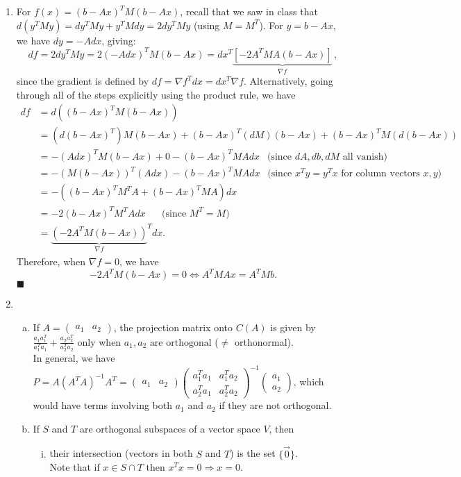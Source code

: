 \documentclass[12pt]{article}
\begin{document}
\begin{enumerate}[1.]
    \item For $f(x) = (b - Ax)^T M (b-Ax)$, recall that we saw in class that $d(y^T M y) = dy^T M y + y^T M dy = 2 dy^T M y$ (using $M = M^T$). For $y = b - Ax$, we have $dy = -Adx$, giving:
    \[
    df = 2 dy^T M y = 2 (-Adx)^T M (b - Ax) = dx^T \underbrace{[-2 A^T M A (b - Ax)]}_{\nabla f} \, ,
    \]
    since the gradient is defined by $df = \nabla f ^T dx = dx^T \nabla f$.  Alternatively, going through all of the steps explicitly using the product rule, we have
    \[
    \begin{split}
    df &= d((b - Ax)^T M (b-Ax)) \\
    &= (d(b - Ax)^T) M (b-Ax) + (b - Ax)^T (dM) (b-Ax) + (b - Ax)^T M (d(b-Ax)) \\
    &= -(A dx)^T M (b-Ax) + 0 - (b - Ax)^T M A dx \ \ \text{ (since $dA, db, dM$ all vanish)}\\
    &=-(M(b-Ax))^T (A dx) - (b-Ax)^T M A dx \ \ \text{ (since $x^T y = y^T x$ for column vectors $x,y$)}\\
    &=-((b-Ax)^T M^T A + (b-Ax)^T MA) dx\\
    &=-2(b-Ax)^T M^T A dx \ \ \ \ \ \  \text{ (since $M^T = M$)}\\
    &= {\underbrace{(-2A^T M (b-Ax))}_{\nabla f}}^T dx.
    \end{split}
    \]
    Therefore, when $\nabla f = 0$, we have
    \[-2A^T M (b-Ax) = 0 \Longleftrightarrow \boxed{A^T M A x = A^T Mb}.\]
        \hfill $\blacksquare$
        \newpage
    \item
    \begin{enumerate}[(a)]
        \item  If $A = \begin{pmatrix} a_1 & a_2 \end{pmatrix}$, the projection matrix onto $C(A)$ is given by $\frac{a_1 a_1^T}{a_1^T a_1} + \frac{a_2 a_2^T}{a_2^T a_2}$ only when $\boxed{a_1, a_2 \text{ are orthogonal}}$ ($\ne$ orthonormal).\\
        In general, we have $P = A (A^T A)^{-1} A^T = \begin{pmatrix} a_1 & a_2 \end{pmatrix} \begin{pmatrix} a_1^T a_1 & a_1^T a_2 \\ a_2^T a_1 & a_2^T a_2 \end{pmatrix}^{-1}  \begin{pmatrix} a_1 \\ a_2 \end{pmatrix}$, which would have terms involving both $a_1$ and $a_2$ if they are not orthogonal.
        \item If $S$ and $T$ are orthogonal subspaces of a vector space $V$, then
        \begin{enumerate}[(i)]
            \item their intersection (vectors in both $S$ and $T$) is the set $\boxed{\{\vec{0}\}}$. \\Note that if $x \in S \cap T$ then $x^T x = 0 \Rightarrow x = 0$.
            

\end{enumerate}
\end{enumerate}
\end{enumerate}
\end{document}
